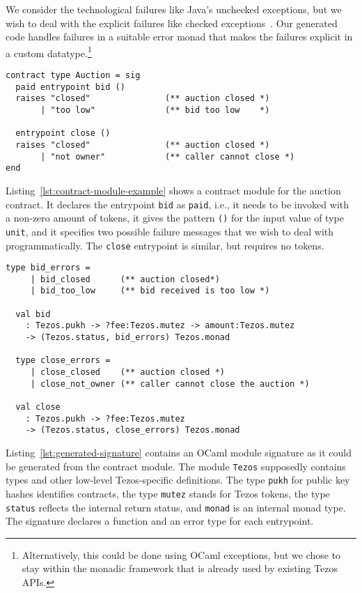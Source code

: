 \documentclass[a4paper,USenglish,american,cleveref, autoref, thm-restate]{oasics-v2021}
\begin{document}
We consider the technological failures like Java's unchecked
exceptions, but we wish to deal with the explicit failures like
checked exceptions~\cite{DBLP:conf/oopsla/AnconaLZ01}.
Our generated code handles failures in a suitable
error monad that makes the failures explicit in a custom
datatype.\footnote{Alternatively, this could be done using OCaml
  exceptions, but we chose to stay within the monadic framework that
  is already used by existing Tezos APIs.}

\begin{lstlisting}[float,captionpos=b,caption={Example contract module},label={lst:contract-module-example}]
contract type Auction = sig
  paid entrypoint bid () 
  raises "closed"               (** auction closed *)
       | "too low"              (** bid too low    *)

  entrypoint close ()
  raises "closed"               (** auction closed *)
       | "not owner"            (** caller cannot close *)
end
\end{lstlisting}
Listing~\ref{lst:contract-module-example} shows a contract module for
the auction contract.  It declares the entrypoint \lstinline/bid/ as
\lstinline/paid/, i.e., it needs to be invoked with a
non-zero amount of tokens, it gives the pattern \lstinline/()/ for the
input value of type \lstinline/unit/, and it specifies two possible
failure messages that we wish to deal with programmatically.
The \lstinline/close/ entrypoint is similar, but requires no tokens.

\begin{lstlisting}[float,captionpos=b,caption={Generated signature},label={lst:generated-signature}]
  type bid_errors = 
     | bid_closed      (** auction closed*)
     | bid_too_low     (** bid received is too low *)

  val bid
    : Tezos.pukh -> ?fee:Tezos.mutez -> amount:Tezos.mutez
    -> (Tezos.status, bid_errors) Tezos.monad

  type close_errors = 
     | close_closed    (** auction closed *)
     | close_not_owner (** caller cannot close the auction *)

  val close
    : Tezos.pukh -> ?fee:Tezos.mutez
    -> (Tezos.status, close_errors) Tezos.monad
\end{lstlisting}
Listing~\ref{lst:generated-signature} contains an OCaml module
signature as it could be generated from the contract module. The
module \lstinline/Tezos/ supposedly contains types and other low-level
Tezos-specific definitions. The type \lstinline/pukh/ for public
key hashes identifies contracts, the type \lstinline/mutez/ stands for
Tezos tokens, the type \lstinline/status/ reflects the internal return
status, and \lstinline/monad/ is an internal monad type. The signature
declares a function and an error type for each entrypoint.
\end{document}
